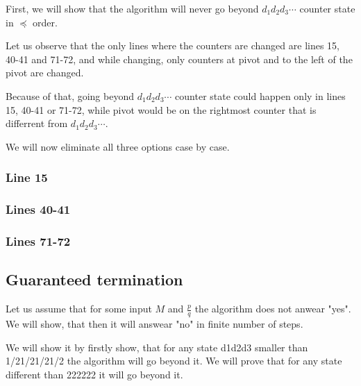 %

First, we will show that the algorithm will never 
go beyond $d_1d_2d_3\cdots$ counter state in $\preceq$ order. 

Let us observe that the only lines where 
the counters are changed are lines 15, 40-41 and 71-72, and while changing, 
only counters 
at pivot and to the left of the pivot are changed. 

Because of that, going beyond $d_1d_2d_3\cdots$ counter state 
could happen only in lines 15, 40-41 or 71-72, while pivot would be 
on the rightmost counter that is differrent from $d_1d_2d_3\cdots$. 

We will now eliminate all three options case by case. 
\subsubsection{Line 15}
\subsubsection{Lines 40-41}
\subsubsection{Lines 71-72}

\subsection{Guaranteed termination}
Let us assume that for some input $M$ and $\frac{p}{q}$ the algorithm does not anwear "yes". 
We will show, that then it will answear "no" in finite number of steps.

We will show it by firstly show, that for any state d1d2d3 smaller than 1/21/21/21/2
the algorithm will go beyond it.
We will prove that for any state different than 222222 it will go beyond it.

